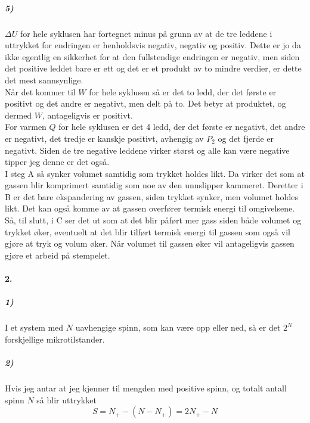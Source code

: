 \documentclass[11pt, A4paper,norsk]{article}
\begin{document}
			\subparagraph{5)}
				\begin{flushleft}
$\Delta U$ for hele syklusen har fortegnet minus på grunn av at de tre leddene i uttrykket for endringen er henholdsvis negativ, negativ og positiv. Dette er jo da ikke egentlig en sikkerhet for at den fullstendige endringen er negativ, men siden det positive leddet bare er ett og det er et produkt av to mindre verdier, er dette det mest sannsynlige. \\
Når det kommer til $W$ for hele syklusen så er det to ledd, der det første er positivt og det andre er negativt, men delt på to. Det betyr at produktet, og dermed $W$, antageligvis er positivt. \\
For varmen $Q$ for hele syklusen er det 4 ledd, der det første er negativt, det andre er negativt, det tredje er kanskje positivt, avhengig av $P_2$ og det fjerde er negativt. Siden de tre negative leddene virker størst og alle kan være negative tipper jeg denne er det også. \\
I steg A så synker volumet samtidig som trykket holdes likt. Da virker det som at gassen blir komprimert samtidig som noe av den unnslipper kammeret. Deretter i B er det bare ekspandering av gassen, siden trykket synker, men volumet holdes likt. Det kan også komme av at gassen overfører termisk energi til omgivelsene. Så, til slutt, i C ser det ut som at det blir påført mer gass siden både volumet og trykket øker, eventuelt at det blir tilført termisk energi til gassen som også vil gjøre at tryk og volum øker.
Når volumet til gassen øker vil antageligvis gassen gjøre et arbeid på stempelet.
				\end{flushleft}









		\paragraph{2.}
			\subparagraph{1)}
				\begin{flushleft}
I et system med $N$ uavhengige spinn, som kan være opp eller ned, så er det $2^N$ forskjellige mikrotilstander.
				\end{flushleft}









			\subparagraph{2)}
				\begin{flushleft}
Hvis jeg antar at jeg kjenner til mengden med positive spinn, og totalt antall spinn $N$ så blir uttrykket
$$S = N_+ - (N - N_+) = 2N_+ - N$$
				\end{flushleft}
\end{document}
